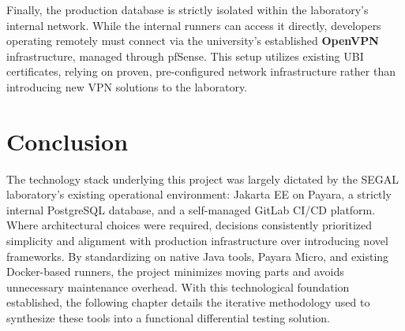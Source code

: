 Finally, the production database is strictly isolated within the laboratory's
internal network. While the internal runners can access it directly,
developers operating remotely must connect via the university's established
\textbf{OpenVPN} infrastructure, managed through pfSense. This setup utilizes
existing \ac{UBI} certificates, relying on proven, pre-configured network
infrastructure rather than introducing new \ac{VPN} solutions to the laboratory.

\section{Conclusion}
\label{chap3:sec:concs}

The technology stack underlying this project was largely dictated by the
\ac{SEGAL} laboratory's existing operational environment: Jakarta EE on
Payara, a strictly internal PostgreSQL database, and a self-managed GitLab
\ac{CI}/\ac{CD} platform. Where architectural choices were required,
decisions consistently prioritized simplicity and alignment with production
infrastructure over introducing novel frameworks. By standardizing on native
Java tools, Payara Micro, and existing Docker-based runners, the project
minimizes moving parts and avoids unnecessary maintenance overhead. With this
technological foundation established, the following chapter details the
iterative methodology used to synthesize these tools into a functional
differential testing solution.